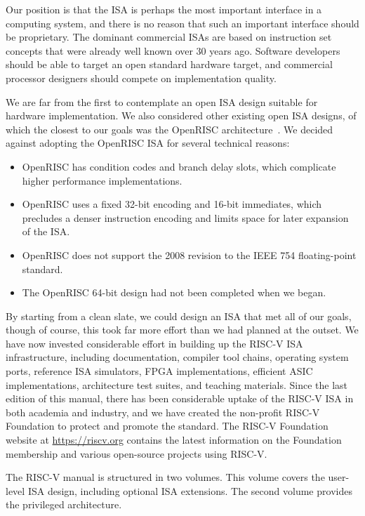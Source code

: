 \begin{commentary}
Our position is that the ISA is perhaps the most important interface
in a computing system, and there is no reason that such an important
interface should be proprietary.  The dominant commercial ISAs are
based on instruction set concepts that were already well known over 30
years ago.  Software developers should be able to target an open
standard hardware target, and commercial processor designers should
compete on implementation quality.

We are far from the first to contemplate an open ISA design suitable
for hardware implementation.  We also considered other existing open
ISA designs, of which the closest to our goals was the OpenRISC
architecture~\cite{openriscarch}.  We decided against adopting the
OpenRISC ISA for several technical reasons:

\begin{itemize}
\item OpenRISC has condition codes and branch delay slots, which
  complicate higher performance implementations.
\item OpenRISC uses a fixed 32-bit encoding and 16-bit immediates,
  which precludes a denser instruction encoding and limits space for
  later expansion of the ISA.
\item OpenRISC does not support the 2008 revision to the IEEE 754
  floating-point standard.
\item The OpenRISC 64-bit design had not been completed when we began.
\end{itemize}

By starting from a clean slate, we could design an ISA that met all of
our goals, though of course, this took far more effort than we had
planned at the outset.  We have now invested considerable effort in
building up the RISC-V ISA infrastructure, including documentation,
compiler tool chains, operating system ports, reference ISA
simulators, FPGA implementations, efficient ASIC implementations,
architecture test suites, and teaching materials. Since the last
edition of this manual, there has been considerable uptake of the
RISC-V ISA in both academia and industry, and we have created the
non-profit RISC-V Foundation to protect and promote the standard.  The
RISC-V Foundation website at \url{https://riscv.org} contains the latest
information on the Foundation membership and various open-source
projects using RISC-V.
\end{commentary}

The RISC-V manual is structured in two volumes.  This volume covers
the user-level ISA design, including optional ISA extensions.  The
second volume provides the privileged architecture.

